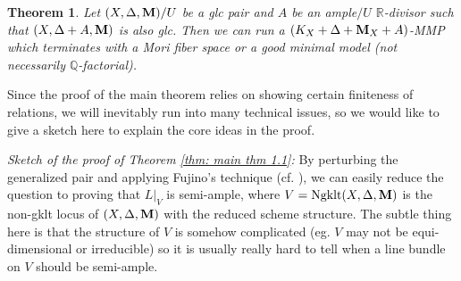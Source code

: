 \documentclass[11pt]{amsart}
\numberwithin{equation}{section}
\newcommand{\Mm}{{\bf{M}}}
\newcommand{\Qq}{\mathbb{Q}}
\newcommand{\Rr}{\mathbb{R}}
\newcommand{\Ngklt}{\operatorname{Ngklt}}
\newtheorem{thm}{Theorem}[section]
\theoremstyle{definition}
\theoremstyle{definition}
\theoremstyle{definition}
\begin{document}
\begin{thm}\label{thm: gmm with A in the boundary}
Let $(X,\Delta,\Mm)/U$ be a glc pair and $A$ be an ample$/U$ $\Rr$-divisor such that $(X,\Delta+A,\Mm)$ is also glc. Then we can run a $(K_X+\Delta+\Mm_X+A)$-MMP which terminates with a Mori fiber space or a good minimal model (not necessarily $\Qq$-factorial).
\end{thm}


\vspace{.5em}

Since the proof of the main theorem relies on showing certain finiteness of relations, we will inevitably run into many technical issues, so we would like to give a sketch here to explain the core ideas in the proof.



\vspace{.5em}

\noindent\textit{ Sketch of the proof of Theorem \ref{thm: main thm 1.1}:} By perturbing the generalized pair and applying Fujino's technique (cf. \cite{Fuj11}), we can easily reduce the question to proving that $L|_V$ is semi-ample, where $V=\Ngklt(X,\Delta,\Mm)$ is the non-gklt locus of $(X,\Delta,\Mm)$ with the reduced scheme structure. The subtle thing here is that the structure of $V$ is somehow complicated (eg. $V$ may not be equi-dimensional or irreducible) so it is usually really hard to tell when a line bundle on $V$ should be semi-ample. 
\end{document}
